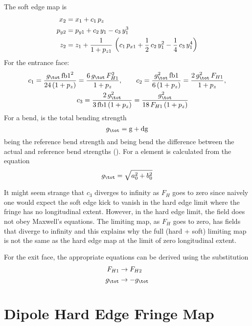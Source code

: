 The soft edge map is
\begin{align}
  x_2 &=  x_1 + c_1 \, p_z \nonumber \\
  p_{y2} &= p_{y1} + c_2 \, y_1 - c_3 \, y_1^3 \\
  z_2 &= z_1 + \frac{1}{1 + p_{z1}} \, \left( 
    c_1 \, p_{x1} + \frac{1}{2} \, c_2 \, y_1^2 -\frac{1}{4} \, c_3 \, y_1^4 \right)
    \nonumber
\end{align}
For the entrance face:
\begin{align}
  c_1 = \frac{g_\tot \, \text{fb1}^2}{24 \, (1 + p_z)} &= \frac{6 \, g_\tot \, F_{H1}^2}{1 + p_z}, \qquad 
  c_2 = \frac{g_\tot^2 \, \text{fb1}}{6 \, (1 + p_z)} = \frac{2 \, g_\tot^2 \, F_{H1}}{1 + p_z}, \CRNO
  &c_3 = \frac{2 \, g_\tot^2}{3 \, \text{fb1} \, (1 + p_z)} = \frac{g_\tot^2}{18 \, F_{H1} \, (1 + p_z)}
\end{align}
For a bend,  is the total bending strength
\begin{equation}
  g_\tot = \text{g} + \text{dg}
\end{equation}
 being the reference bend strength and  being bend the difference between the actual
and reference bend strengths (). For a  element  is calculated
from the equation
\begin{equation}
  g_\tot = \sqrt{a_0^2 + b_0^2}
\end{equation}

It might seem strange that $c_3$ diverges to infinity as $F_H$ goes to zero since naively one would
expect the soft edge kick to vanish in the hard edge limit where the fringe has no longitudinal
extent. However, in the hard edge limit, the field does not obey Maxwell's equations. The limiting
map, as $F_H$ goes to zero, has fields that diverge to infinity and this explains why the full
(hard + soft) limiting map is not the same as the hard edge map at the limit of zero longitudinal
extent.

For the exit face, the appropriate equations can be derived using the substitution
\begin{align}
  F_{H1} &\rightarrow F_{H2} \CRNO
  g_\tot &\rightarrow -g_\tot
\end{align}

\section{Dipole Hard Edge Fringe Map}
\label{s:fringe.bend.hard}

